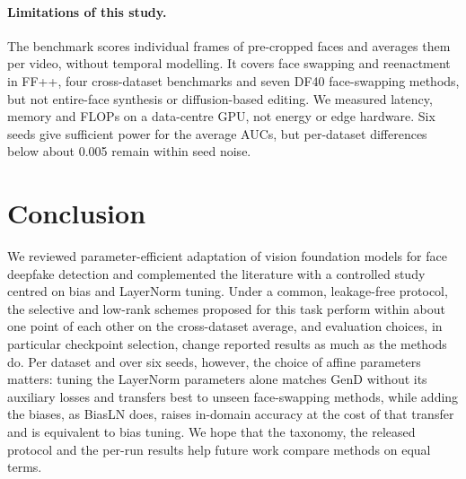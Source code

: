 \documentclass[fonts]{icst}
\begin{document}
\paragraph{Limitations of this study.}\label{sec:limits} The benchmark scores individual frames of pre-cropped faces and averages them per video, without temporal modelling. It covers face swapping and reenactment in FF++, four cross-dataset benchmarks and seven DF40 face-swapping methods, but not entire-face synthesis or diffusion-based editing. We measured latency, memory and FLOPs on a data-centre GPU, not energy or edge hardware. Six seeds give sufficient power for the average AUCs, but per-dataset differences below about 0.005 remain within seed noise.

\section{Conclusion}
We reviewed parameter-efficient adaptation of vision foundation models for face deepfake detection and complemented the literature with a controlled study centred on bias and LayerNorm tuning. Under a common, leakage-free protocol, the selective and low-rank schemes proposed for this task perform within about one point of each other on the cross-dataset average, and evaluation choices, in particular checkpoint selection, change reported results as much as the methods do. Per dataset and over six seeds, however, the choice of affine parameters matters: tuning the LayerNorm parameters alone matches GenD without its auxiliary losses and transfers best to unseen face-swapping methods, while adding the biases, as BiasLN does, raises in-domain accuracy at the cost of that transfer and is equivalent to bias tuning. We hope that the taxonomy, the released protocol and the per-run results help future work compare methods on equal terms.
\end{document}
